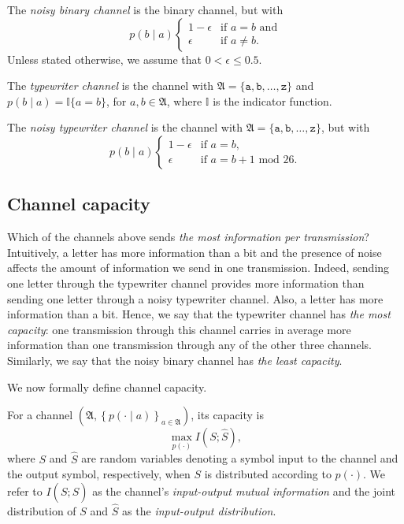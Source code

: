 \begin{example}
The \emph{noisy binary channel} is the binary channel, but with 
%
$$p(b \mid a) 
\begin{cases}
1 - \epsilon & \text{if $a = b$ and}\\
\epsilon & \text{if $a \neq b$.}
\end{cases}
$$
%
Unless stated otherwise, we assume that $0 < \epsilon \leq 0.5$.
\end{example}

\begin{example}
The \emph{typewriter channel} is the channel with $\mathfrak{A} = \{\texttt{a}, \texttt{b}, \ldots, \texttt{z}\}$ and $p(b \mid a) = \mathbb{I}\{a=b\}$, for $a, b \in \mathfrak{A}$, where $\mathbb{I}$ is the indicator function.
\end{example}

\begin{example}
The \emph{noisy typewriter channel} is the channel with $\mathfrak{A} = \{\texttt{a}, \texttt{b}, \ldots, \texttt{z}\}$, but with
%
$$p(b \mid a) 
\begin{cases}
1 - \epsilon & \text{if $a = b$,}\\
\epsilon & \text{if $a = b + 1 \text{ mod } 26$.}
\end{cases}
$$
%
\end{example}

\subsection{Channel capacity}

Which of the channels above sends \emph{the most information per transmission}? Intuitively, a letter has more information than a bit and the presence of noise affects the amount of information we send in one transmission. Indeed, sending one letter through the typewriter channel provides more information than sending one letter through a noisy typewriter channel. Also, a letter has more information than a bit. Hence, we say that the typewriter channel has \emph{the most capacity}: one transmission through this channel carries in average more information than one transmission through any of the other three channels. Similarly, we say that the noisy binary channel has \emph{the least capacity}.

We now formally define channel capacity.

\begin{definition}
For a channel $\left(\mathfrak{A}, \left\{p(\cdot \mid a)\right\}_{a \in \mathfrak{A}}\right)$, its capacity is
%
$$\max_{p(\cdot)} I(S; \hat{S}),$$
%
where $S$ and $\hat{S}$ are random variables denoting a symbol input to the channel and the output symbol, respectively, when $S$ is distributed according to $p(\cdot)$. We refer to $I(S; \hat{S})$ as the channel's \emph{input-output mutual information} and the joint distribution of $S$ and $\hat{S}$ as the \emph{input-output distribution}.
\end{definition}

